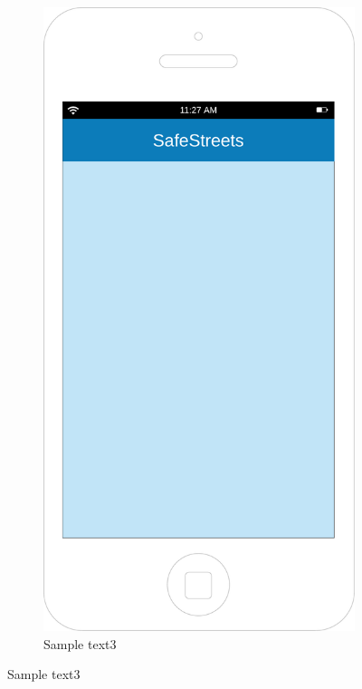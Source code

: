 \documentclass[12pt,a4paper]{report}
\begin{document}
		\begin{figure}
		\begin{subfigure}{0.5\textwidth}
			\includegraphics[scale=0.25, center]{Background}
			\caption{Sample text3}
			\label{fig:subim2}
		\end{subfigure}
		\end{figure}
\end{document}
